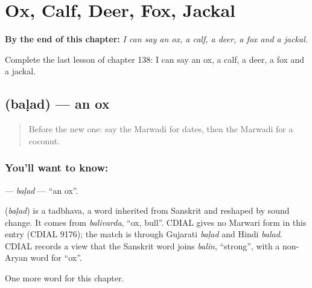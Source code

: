 
\chapter{Ox, Calf, Deer, Fox, Jackal}
\label{ch:mw-ox-calf-deer-fox-jackal}

\begin{chapteropening}
\textbf{By the end of this chapter:} \emph{I can say an ox, a calf, a deer, a fox and a jackal.}

Complete the last lesson of chapter 138: I can say an ox, a calf, a deer, a fox and a jackal.
\end{chapteropening}

\section[\texorpdfstring{\mw{बळद} (baḷad)}{बळद (baḷad)}]{ (baḷad) — an ox}

\label{lesson:MW-C138-balad}



\begin{quote}
Before the new one: say the Marwadi for dates, then the Marwadi for a coconut.
\end{quote}

\subsection*{You'll want to know: }
\textbf{} — \emph{baḷad} — \textquotedblleft{}an ox\textquotedblright{}.

\begin{cousinweb}
\textbf{} (\emph{baḷad}) is a tadbhava, a word inherited from Sanskrit and reshaped by sound change. It comes from \emph{balivarda}, \textquotedblleft{}ox, bull\textquotedblright{}. CDIAL gives no Marwari form in this entry (CDIAL 9176); the match is through Gujarati \emph{baḷad} and Hindi \emph{balad}. CDIAL records a view that the Sanskrit word joins \emph{balin}, \textquotedblleft{}strong\textquotedblright{}, with a non-Aryan word for \textquotedblleft{}ox\textquotedblright{}.
\end{cousinweb}

\begin{grammarlens}[title={What you've built}]
One more word for this chapter.
\end{grammarlens}

